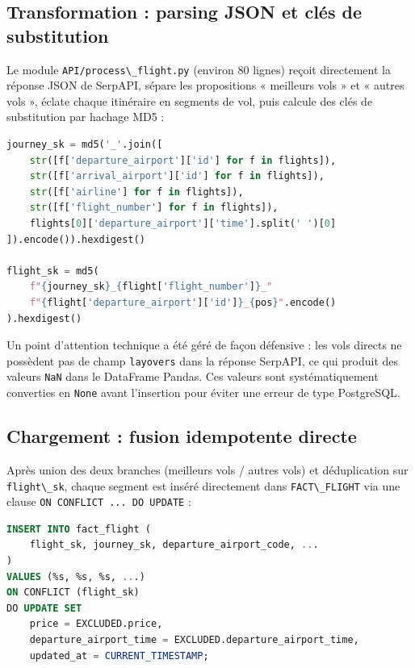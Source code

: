 \documentclass[11pt,a4paper]{report}
\newcommand{\code}[1]{\lstinline{#1}}
\begin{document}
\subsection{Transformation : parsing JSON et clés de substitution}

Le module \code{API/process\_flight.py} (environ 80 lignes) reçoit directement la réponse JSON de SerpAPI, sépare les propositions « meilleurs vols » et « autres vols », éclate chaque itinéraire en segments de vol, puis calcule des clés de substitution par hachage MD5 :

\begin{lstlisting}[language=Python, caption={\code{process\_flight.py} -- calcul des clés de substitution par hachage}]
journey_sk = md5('_'.join([
    str([f['departure_airport']['id'] for f in flights]),
    str([f['arrival_airport']['id'] for f in flights]),
    str([f['airline'] for f in flights]),
    str([f['flight_number'] for f in flights]),
    flights[0]['departure_airport']['time'].split(' ')[0]
]).encode()).hexdigest()

flight_sk = md5(
    f"{journey_sk}_{flight['flight_number']}_"
    f"{flight['departure_airport']['id']}_{pos}".encode()
).hexdigest()
\end{lstlisting}

Un point d'attention technique a été géré de façon défensive : les vols directs ne possèdent pas de champ \code{layovers} dans la réponse SerpAPI, ce qui produit des valeurs \code{NaN} dans le DataFrame Pandas. Ces valeurs sont systématiquement converties en \code{None} avant l'insertion pour éviter une erreur de type PostgreSQL.

\subsection{Chargement : fusion idempotente directe}

Après union des deux branches (meilleurs vols / autres vols) et déduplication sur \code{flight\_sk}, chaque segment est inséré directement dans \code{FACT\_FLIGHT} via une clause \code{ON CONFLICT ... DO UPDATE} :

\begin{lstlisting}[language=SQL, caption={\code{process\_flight.py} -- fusion idempotente directe vers FACT\_FLIGHT}]
INSERT INTO fact_flight (
    flight_sk, journey_sk, departure_airport_code, ...
)
VALUES (%s, %s, %s, ...)
ON CONFLICT (flight_sk)
DO UPDATE SET
    price = EXCLUDED.price,
    departure_airport_time = EXCLUDED.departure_airport_time,
    updated_at = CURRENT_TIMESTAMP;
\end{lstlisting}
\end{document}
